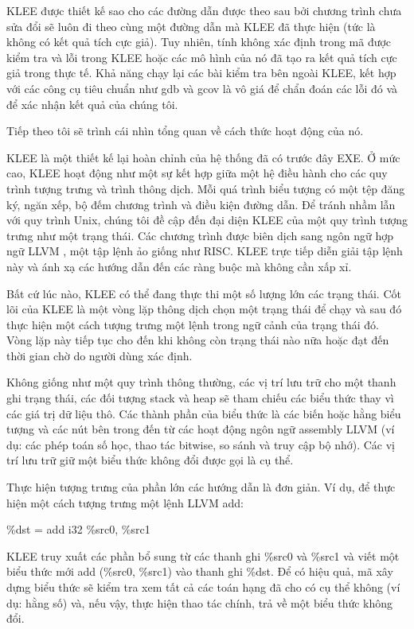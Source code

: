 \documentclass[12pt,a4paper]{article}
\begin{document}
\indent KLEE được thiết kế sao cho các đường dẫn được theo sau bởi chương trình chưa sửa đổi sẽ luôn đi theo cùng một đường dẫn mà KLEE đã thực hiện (tức là không có kết quả tích cực giả). Tuy nhiên, tính không xác định trong mã được kiểm tra và lỗi trong KLEE hoặc các mô hình của nó đã tạo ra kết quả tích cực giả trong thực tế. Khả năng chạy lại các bài kiểm tra bên ngoài KLEE, kết hợp với các công cụ tiêu chuẩn như gdb và gcov là vô giá để chẩn đoán các lỗi đó và để xác nhận kết quả của chúng tôi.

\indent Tiếp theo tôi sẽ trình cái nhìn tổng quan về cách thức hoạt động của nó.

\indent KLEE là một thiết kế lại hoàn chỉnh của hệ thống đã có trước đây EXE. Ở mức cao, KLEE hoạt động như một sự kết hợp giữa một hệ điều hành cho các quy trình tượng trưng và trình thông dịch. Mỗi quá trình biểu tượng có một tệp đăng ký, ngăn xếp, bộ đếm chương trình và điều kiện đường dẫn. Để tránh nhầm lẫn với quy trình Unix, chúng tôi đề cập đến đại diện KLEE của một quy trình tượng trưng như một trạng thái. Các chương trình được biên dịch sang ngôn ngữ hợp ngữ LLVM \cite{lattner2004llvm}, một tập lệnh ảo giống như RISC. KLEE trực tiếp diễn giải tập lệnh này và ánh xạ các hướng dẫn đến các ràng buộc mà không cần xấp xỉ.

\indent Bất cứ lúc nào, KLEE có thể đang thực thi một số lượng lớn các trạng thái. Cốt lõi của KLEE là một vòng lặp thông dịch chọn một trạng thái để chạy và sau đó thực hiện một cách tượng trưng một lệnh trong ngữ cảnh của trạng thái đó. Vòng lặp này tiếp tục cho đến khi không còn trạng thái nào nữa hoặc đạt đến thời gian chờ do người dùng xác định.

\indent Không giống như một quy trình thông thường, các vị trí lưu trữ cho một thanh ghi trạng thái, các đối tượng stack và heap sẽ tham chiếu các biểu thức  thay vì các giá trị dữ liệu thô. Các thành phần của biểu thức là các biến hoặc hằng biểu tượng và các nút bên trong đến từ các hoạt động ngôn ngữ assembly LLVM (ví dụ: các phép toán số học, thao tác bitwise, so sánh và truy cập bộ nhớ). Các vị trí lưu trữ giữ một biểu thức không đổi được gọi là cụ thể.

\indent Thực hiện tượng trưng của phần lớn các hướng dẫn là đơn giản. Ví dụ, để thực hiện một cách tượng trưng một lệnh LLVM add:

\begin{center}
\%dst = add i32 \%src0, \%src1
\end{center}

\indent KLEE truy xuất các phần bổ sung từ các thanh ghi \%src0 và \%src1 và viết một biểu thức mới add (\%src0, \%src1) vào thanh ghi \%dst. Để có hiệu quả, mã xây dựng biểu thức sẽ kiểm tra xem tất cả các toán hạng đã cho có cụ thể không (ví dụ: hằng số) và, nếu vậy, thực hiện thao tác chính, trả về một biểu thức không đổi.
\end{document}
